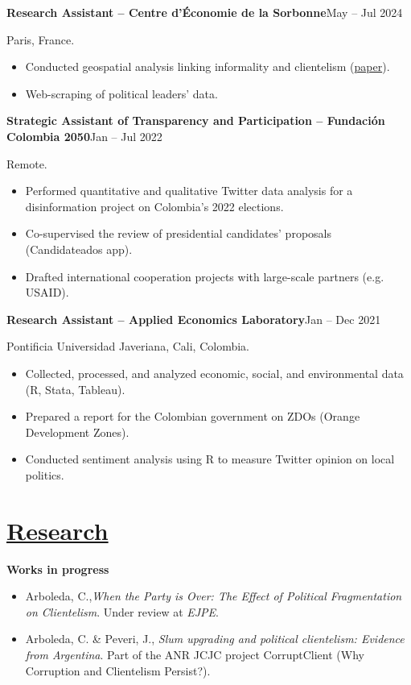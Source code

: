 \documentclass[10pt,a4paper]{article}
\newcommand{\entry}[2]{\textbf{#1}\hfill #2\par}
\begin{document}
\entry{Research Assistant -- Centre d'Économie de la Sorbonne}{May -- Jul 2024}
Paris, France.
\begin{itemize}
\item Conducted geospatial analysis linking informality and clientelism (\href{https://thedocs.worldbank.org/en/doc/ba22d404ef87ba9e207f09b4866b8a8b-0350012025/original/Julieta-Peveri-Pardelli-state-capacity-informality-clientelism-2025-01.pdf}{paper}).
\item Web-scraping of political leaders' data.
\end{itemize}

\entry{Strategic Assistant of Transparency and Participation -- Fundación Colombia 2050}{Jan -- Jul 2022}
Remote.
\begin{itemize}
\item Performed quantitative and qualitative Twitter data analysis for a disinformation project on Colombia's 2022 elections.
\item Co-supervised the review of presidential candidates' proposals (Candidateados app).
\item Drafted international cooperation projects with large-scale partners (e.g. USAID).
\end{itemize}

\entry{Research Assistant -- Applied Economics Laboratory}{Jan -- Dec 2021}
Pontificia Universidad Javeriana, Cali, Colombia.
\begin{itemize}
\item Collected, processed, and analyzed economic, social, and environmental data (R, Stata, Tableau).
\item Prepared a report for the Colombian government on ZDOs (Orange Development Zones).
\item Conducted sentiment analysis using R to measure Twitter opinion on local politics.
\end{itemize}



\section[Research]{\href{https://carolinaarboledalenis.github.io/publications/}{Research}}
\textbf{Works in progress}
\begin{itemize}
\item Arboleda, C.,\emph{When the Party is Over: The Effect of Political Fragmentation on Clientelism}. Under review at \emph{EJPE}.
\item Arboleda, C. \& Peveri, J., \emph{Slum upgrading and political clientelism: Evidence from Argentina}. Part of the ANR JCJC project CorruptClient (Why Corruption and Clientelism Persist?).
\end{itemize}
\end{document}
